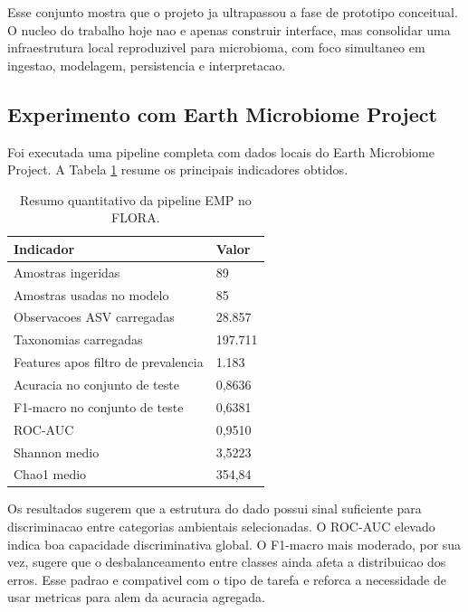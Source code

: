 \documentclass[12pt,a4paper]{article}
\begin{document}
Esse conjunto mostra que o projeto ja ultrapassou a fase de prototipo conceitual. O nucleo do trabalho hoje nao e apenas construir interface, mas consolidar uma infraestrutura local reproduzivel para microbioma, com foco simultaneo em ingestao, modelagem, persistencia e interpretacao.

\subsection{Experimento com Earth Microbiome Project}

Foi executada uma pipeline completa com dados locais do Earth Microbiome Project. A Tabela \ref{tab:emp_resumo} resume os principais indicadores obtidos.

\begin{table}[H]
    \centering
    \caption{Resumo quantitativo da pipeline EMP no FLORA.}
    \label{tab:emp_resumo}
    \begin{tabular}{>{\raggedright\arraybackslash}p{8cm}p{4cm}}
        \toprule
        \textbf{Indicador} & \textbf{Valor} \\
        \midrule
        Amostras ingeridas & 89 \\
        Amostras usadas no modelo & 85 \\
        Observacoes ASV carregadas & 28.857 \\
        Taxonomias carregadas & 197.711 \\
        Features apos filtro de prevalencia & 1.183 \\
        Acuracia no conjunto de teste & 0,8636 \\
        F1-macro no conjunto de teste & 0,6381 \\
        ROC-AUC & 0,9510 \\
        Shannon medio & 3,5223 \\
        Chao1 medio & 354,84 \\
        \bottomrule
    \end{tabular}
\end{table}

Os resultados sugerem que a estrutura do dado possui sinal suficiente para discriminacao entre categorias ambientais selecionadas. O ROC-AUC elevado indica boa capacidade discriminativa global. O F1-macro mais moderado, por sua vez, sugere que o desbalanceamento entre classes ainda afeta a distribuicao dos erros. Esse padrao e compativel com o tipo de tarefa e reforca a necessidade de usar metricas para alem da acuracia agregada.
\end{document}

